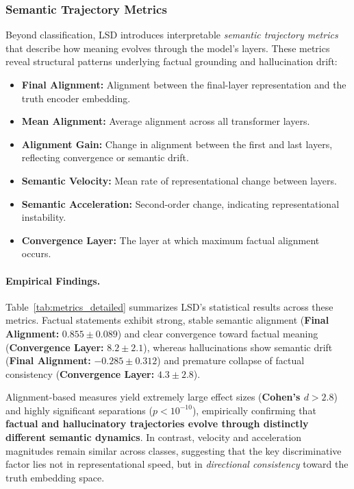 \documentclass[11pt]{article}
\begin{document}
\subsubsection{Semantic Trajectory Metrics}

Beyond classification, LSD introduces interpretable \emph{semantic trajectory metrics} that describe how meaning evolves through the model’s layers.  
These metrics reveal structural patterns underlying factual grounding and hallucination drift:

\begin{itemize}[leftmargin=*]
    \item \textbf{Final Alignment:} Alignment between the final-layer representation and the truth encoder embedding.
    \item \textbf{Mean Alignment:} Average alignment across all transformer layers.
    \item \textbf{Alignment Gain:} Change in alignment between the first and last layers, reflecting convergence or semantic drift.
    \item \textbf{Semantic Velocity:} Mean rate of representational change between layers.
    \item \textbf{Semantic Acceleration:} Second-order change, indicating representational instability.
    \item \textbf{Convergence Layer:} The layer at which maximum factual alignment occurs.
\end{itemize}

\paragraph{Empirical Findings.}  
Table~\ref{tab:metrics_detailed} summarizes LSD’s statistical results across these metrics.  
Factual statements exhibit strong, stable semantic alignment (\textbf{Final Alignment:} $0.855 \pm 0.089$) and clear convergence toward factual meaning (\textbf{Convergence Layer:} $8.2 \pm 2.1$), whereas hallucinations show semantic drift (\textbf{Final Alignment:} $-0.285 \pm 0.312$) and premature collapse of factual consistency (\textbf{Convergence Layer:} $4.3 \pm 2.8$).  

Alignment-based measures yield extremely large effect sizes (\textbf{Cohen’s $d > 2.8$}) and highly significant separations ($p < 10^{-10}$), empirically confirming that \textbf{factual and hallucinatory trajectories evolve through distinctly different semantic dynamics}.  
In contrast, velocity and acceleration magnitudes remain similar across classes, suggesting that the key discriminative factor lies not in representational speed, but in \emph{directional consistency} toward the truth embedding space.
\end{document}
